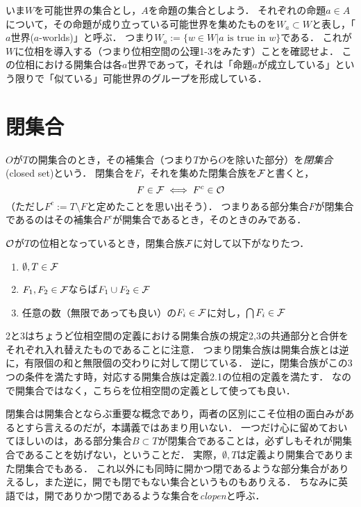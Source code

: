 \documentclass[11pt,a4paper]{jsarticle}
\begin{document}
\begin{example}
\label{possibleworlds}
いま$W$を可能世界の集合とし，$A$を命題の集合としよう．
それぞれの命題$a \in A$について，その命題が成り立っている可能世界を集めたものを$W_a \subset W$と表し，「$a$世界($a$-worlds)」と呼ぶ．
つまり$W_a := \{ w \in W | a \text{ is true in } w \}$である．
これが$W$に位相を導入する（つまり位相空間の公理1-3をみたす）ことを確認せよ．
この位相における開集合は各$a$世界であって，それは「命題$a$が成立している」という限りで「似ている」可能世界のグループを形成している．
\end{example}


\section{閉集合}
$O$が$T$の開集合のとき，その補集合（つまり$T$から$O$を除いた部分）を\emph{閉集合}(closed set)という．
閉集合を$F$，それを集めた閉集合族を$\mathcal{F}$と書くと，
\[
 F \in \mathcal{F} \iff F^c \in \mathcal{O}
\]
（ただし$F^c := T \setminus F$と定めたことを思い出そう）．
つまりある部分集合$F$が閉集合であるのはその補集合$F^c$が開集合であるとき，そのときのみである．

$\mathcal{O}$が$T$の位相となっているとき，閉集合族$\mathcal{F}$に対して以下がなりたつ．
\begin{enumerate}
 \item $\emptyset, T \in \mathcal{F}$
 \item $F_1, F_2 \in \mathcal{F}$ならば$F_1 \cup F_2 \in \mathcal{F}$
 \item 任意の数（無限であっても良い）の$F_i \in \mathcal{F}$に対し，$\bigcap F_i \in \mathcal{F}$
\end{enumerate}
2と3はちょうど位相空間の定義における開集合族の規定2,3の共通部分と合併をそれぞれ入れ替えたものであることに注意．
つまり閉集合族は開集合族とは逆に，有限個の和と無限個の交わりに対して閉じている．
逆に，閉集合族がこの3つの条件を満たす時，対応する開集合族は定義2.1の位相の定義を満たす．
なので開集合ではなく，こちらを位相空間の定義として使っても良い．

閉集合は開集合とならぶ重要な概念であり，両者の区別にこそ位相の面白みがあるとすら言えるのだが，本講義ではあまり用いない．
一つだけ心に留めておいてほしいのは，ある部分集合$B \subset T$が閉集合であることは，必ずしもそれが開集合であることを妨げない，ということだ．
実際，$\emptyset, T$は定義より開集合でありまた閉集合でもある．
これ以外にも同時に開かつ閉であるような部分集合がありえるし，また逆に，開でも閉でもない集合というものもありえる．
ちなみに英語では，開でありかつ閉であるような集合を\emph{clopen}と呼ぶ．
\end{document}
